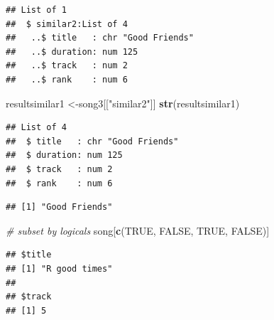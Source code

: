 \documentclass[]{book}
\newenvironment{Shaded}{\begin{snugshade}}{\end{snugshade}}
\newcommand{\KeywordTok}[1]{\textcolor[rgb]{0.13,0.29,0.53}{\textbf{{#1}}}}
\newcommand{\StringTok}[1]{\textcolor[rgb]{0.31,0.60,0.02}{{#1}}}
\newcommand{\CommentTok}[1]{\textcolor[rgb]{0.56,0.35,0.01}{\textit{{#1}}}}
\newcommand{\OtherTok}[1]{\textcolor[rgb]{0.56,0.35,0.01}{{#1}}}
\newcommand{\NormalTok}[1]{{#1}}
\begin{document}
\begin{verbatim}
## List of 1
##  $ similar2:List of 4
##   ..$ title   : chr "Good Friends"
##   ..$ duration: num 125
##   ..$ track   : num 2
##   ..$ rank    : num 6
\end{verbatim}

\begin{Shaded}
\begin{Highlighting}[]
\NormalTok{resultsimilar1 <-song3[[}\StringTok{"similar2"}\NormalTok{]]}
\KeywordTok{str}\NormalTok{(resultsimilar1)}
\end{Highlighting}
\end{Shaded}

\begin{verbatim}
## List of 4
##  $ title   : chr "Good Friends"
##  $ duration: num 125
##  $ track   : num 2
##  $ rank    : num 6
\end{verbatim}

\begin{Shaded}
\end{Shaded}

\begin{verbatim}
## [1] "Good Friends"
\end{verbatim}

\begin{Shaded}
\begin{Highlighting}[]
\CommentTok{# subset by logicals}
\NormalTok{song[}\KeywordTok{c}\NormalTok{(}\OtherTok{TRUE}\NormalTok{, }\OtherTok{FALSE}\NormalTok{, }\OtherTok{TRUE}\NormalTok{, }\OtherTok{FALSE}\NormalTok{)]}
\end{Highlighting}
\end{Shaded}

\begin{verbatim}
## $title
## [1] "R good times"
## 
## $track
## [1] 5
\end{verbatim}

\begin{Shaded}
\end{Shaded}
\end{document}
